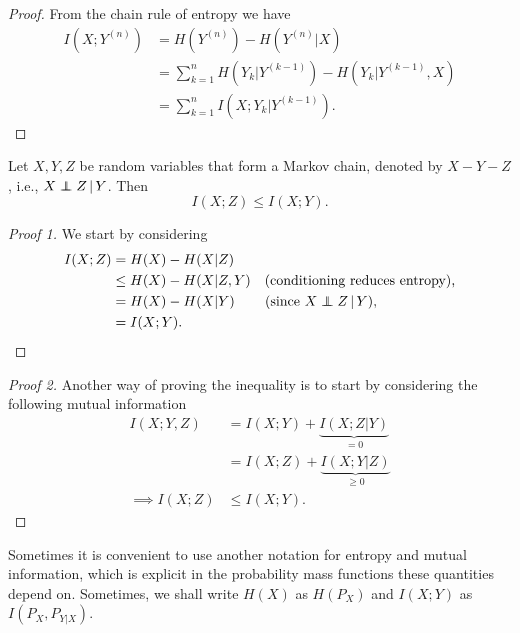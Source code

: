 \documentclass[11pt,a4paper]{article}
\begin{document}
\begin{proof}
    From the chain rule of entropy we have
    \begin{align*}
        I(X; Y^{(n)}) &= H(Y^{(n)}) - H(Y^{(n)}|X) \\
        &= \sum_{k=1}^n H(Y_k| Y^{(k-1)}) - H(Y_k| Y^{(k-1)},X) \\
        &= \sum_{k=1}^n I(X; Y_k| Y^{(k-1)}).
    \end{align*}
\end{proof}

\begin{theorem}
    Let $X,Y,Z$ be random variables that form a Markov chain, denoted by $X - Y - Z$, i.e., $X\perp\!\!\!\!\perp Z\, |\, Y$. Then 
    \begin{equation*}
        I(X;Z) \le I(X;Y).
    \end{equation*}
\end{theorem}

\begin{proof}[Proof 1]
    We start by considering
    \begin{align*}
        I(X;Z) &= H(X) - H(X|Z) \\
        &\le H(X) - H(X|Z,Y) \quad\text{(conditioning reduces entropy),} \\
        &= H(X) - H(X|Y) \,\qquad(\text{since }X\perp\!\!\!\!\perp Z\,|\,Y), \\
        &= I(X;Y).
    \end{align*}
\end{proof}

\begin{proof}[Proof 2]
    Another way of proving the inequality is to start by considering the following mutual information
    \begin{align*}
        I(X;Y,Z) &= I(X;Y) + \underbrace{I(X;Z|Y)}_{ = 0} \\
        &= I(X;Z) + \underbrace{I(X;Y|Z)}_{\ge 0} \\
       \implies I(X;Z) &\le I(X;Y).
    \end{align*}
\end{proof}

\begin{remark}
    Sometimes it is convenient to use another notation for entropy and mutual information, which is explicit in the probability mass functions these quantities depend on. Sometimes, we shall write $H(X)$ as $H(P_X)$ and $I(X;Y)$ as $I(P_X, P_{Y|X}).$    
\end{remark}
\end{document}
